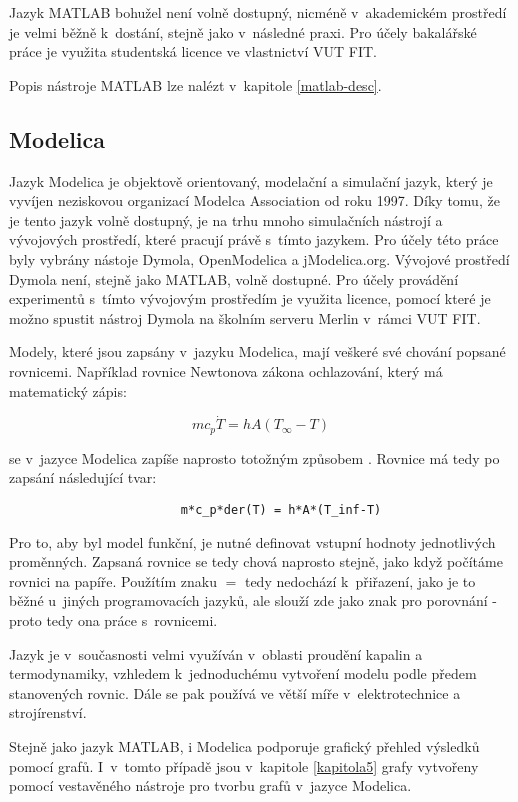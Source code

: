 Jazyk MATLAB bohužel není volně dostupný, nicméně v~akademickém prostředí je velmi běžně k~dostání, stejně jako v~následné praxi. Pro účely bakalářské práce je využita studentská licence ve vlastnictví VUT FIT.

Popis nástroje MATLAB lze nalézt v~kapitole \ref{matlab-desc}.
\subsection{Modelica}
\label{modelica-lang}
Jazyk Modelica je objektově orientovaný, modelační a simulační jazyk, který je vyvíjen neziskovou organizací Modelca Association od roku 1997. Díky tomu, že je tento jazyk volně dostupný, je na trhu mnoho simulačních nástrojí a vývojových prostředí, které pracují právě s~tímto jazykem. Pro účely této práce byly vybrány nástoje Dymola, OpenModelica a jModelica.org. Vývojové prostředí Dymola není, stejně jako MATLAB, volně dostupné. Pro účely provádění experimentů s~tímto vývojovým prostředím je využita licence, pomocí které je možno spustit nástroj Dymola na školním serveru Merlin v~rámci VUT FIT.

Modely, které jsou zapsány v~jazyku Modelica, mají veškeré své chování popsané rovnicemi. Například rovnice Newtonova zákona ochlazování, který má matematický zápis:

\begin{equation}
    mc_p\Dot{T} = hA(T_{\infty} - T)
\end{equation}

se v~jazyce Modelica zapíše naprosto totožným způsobem \cite{modelica-example}. Rovnice má tedy po zapsání následující tvar:

\begin{verbatim}
                        m*c_p*der(T) = h*A*(T_inf-T)
\end{verbatim}

Pro to, aby byl model funkční, je nutné definovat vstupní hodnoty jednotlivých proměnných. Zapsaná rovnice se tedy chová naprosto stejně, jako když počítáme rovnici na papíře. Použítím znaku $ = $ tedy nedochází k~přiřazení, jako je to běžné u~jiných programovacích jazyků, ale slouží zde jako znak pro porovnání - proto tedy ona práce s~rovnicemi.

Jazyk je v~současnosti velmi využíván v~oblasti proudění kapalin a termodynamiky, vzhledem k~jednoduchému vytvoření modelu podle předem stanovených rovnic. Dále se pak používá ve větší míře v~elektrotechnice a strojírenství.

Stejně jako jazyk MATLAB, i Modelica podporuje grafický přehled výsledků pomocí grafů. I~v~tomto případě jsou v~kapitole \ref{kapitola5} grafy vytvořeny pomocí vestavěného nástroje pro tvorbu grafů v~jazyce Modelica.

